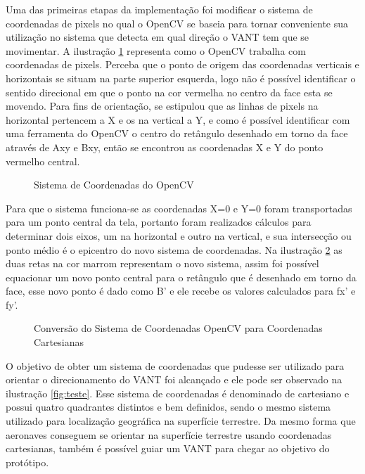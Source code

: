 Uma das primeiras etapas da implementação foi modificar o sistema de coordenadas de pixels no qual o OpenCV se baseia para tornar conveniente sua utilização no sistema que detecta em qual direção o VANT tem que se movimentar. A ilustração \ref{fig:quad1} representa como o OpenCV trabalha com coordenadas de pixels.  Perceba que o ponto de origem das coordenadas verticais e horizontais se situam na parte superior esquerda, logo não é possível identificar o sentido direcional em que o ponto na cor vermelha no centro da face esta se movendo. Para fins de orientação, se estipulou que as linhas de pixels na horizontal pertencem a X e os na vertical a Y, e como é possível identificar com uma ferramenta do OpenCV o centro do retângulo desenhado em torno da face através de Axy e Bxy, então se encontrou as coordenadas X e Y do ponto vermelho central.

\begin{figure}[H]
	\centering
	\caption{Sistema de Coordenadas do OpenCV}
	
	\label{fig:quad1}
\end{figure}

Para que o sistema funciona-se as coordenadas X=0 e Y=0 foram transportadas para um ponto central da tela, portanto foram realizados cálculos para determinar dois eixos, um na horizontal e outro na vertical, e sua intersecção ou ponto médio é o epicentro do novo sistema de coordenadas. Na ilustração \ref{fig:quad2} as duas retas na cor marrom representam o novo sistema, assim foi possível equacionar um novo ponto central para o retângulo que é  desenhado em torno da face, esse novo ponto é dado como B' e ele recebe os valores calculados para fx' e fy'.   

\begin{figure}[H]
	\centering
	\caption{Conversão do Sistema de Coordenadas OpenCV para Coordenadas Cartesianas}
	
	\label{fig:quad2}
\end{figure}

O objetivo de obter um sistema de coordenadas que pudesse ser utilizado para orientar o direcionamento do VANT foi alcançado e ele pode ser observado na ilustração \ref{fig:teste}. Esse sistema de coordenadas é denominado de cartesiano e possui quatro quadrantes distintos e bem definidos, sendo o mesmo sistema utilizado para localização geográfica na superfície terrestre. Da mesmo forma que aeronaves conseguem se orientar na superfície terrestre usando coordenadas cartesianas, também é possível guiar um VANT para chegar ao objetivo do protótipo.

